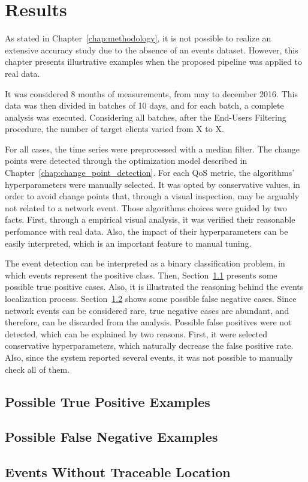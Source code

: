 \chapter{Results}
\label{chap:results}

As stated in Chapter~\ref{chap:methodology}, it is not possible to realize an
extensive accuracy study due to the absence of an events dataset.
However, this chapter presents illustrative examples when the proposed pipeline
was applied to real data.

It was considered 8 months of measurements, from may to december 2016.
This data was then divided in batches of 10 days, and for each batch,
a complete analysis was executed.
Considering all batches, after the End-Users Filtering procedure,
the number of target clients varied from X to X.

For all cases, the time series were preprocessed with a median filter.
The change points were detected through the optimization model described in
Chapter~\ref{chap:change_point_detection}.
For each QoS metric, the algorithms' hyperparameters were manually selected.
It was opted by conservative values, in order to avoid change points that,
through a visual inspection, may be arguably not related to a network event.
Those algorithms choices were guided by two facts.
First, through a empirical visual analysis,
it was verified their reasonable perfomance with real data.
Also, the impact of their hyperparameters can be easily interpreted, which is
an important feature to manual tuning.

The event detection can be interpreted as a binary classification problem, in
which events represent the positive class.
Then, Section~\ref{sec:possible_true_positive_examples} presents some
possible true positive cases.
Also, it is illustrated the reasoning behind the events localization process.
Section~\ref{sec:possible_false_negative_examples} shows some possible false
negative cases.
Since network events can be considered rare, true negative cases are abundant,
and therefore, can be discarded from the analysis.
Possible false positives were not detected, which can be explained by two
reasons. First, it were selected conservative hyperparameters, which naturally
decrease the false positive rate. Also, since the system reported
several events, it was not possible to manually check all of them.

\section{Possible True Positive Examples}
\label{sec:possible_true_positive_examples}

\section{Possible False Negative Examples}
\label{sec:possible_false_negative_examples}

\section{Events Without Traceable Location}
\label{sec:events_without_traceable_location}
